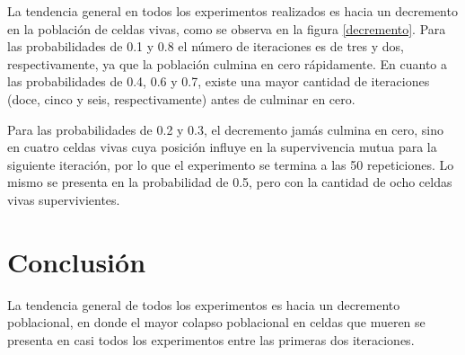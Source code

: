 \documentclass{article}
\begin{document}
La tendencia general en todos los experimentos realizados es hacia un decremento en la población de celdas vivas, como se observa en la figura \ref{decremento}. Para las probabilidades de 0.1 y 0.8 el número de iteraciones es de tres y dos, respectivamente, ya  que la población culmina en cero rápidamente. En cuanto a las probabilidades de 0.4, 0.6 y 0.7, existe una mayor cantidad de iteraciones (doce, cinco y seis, respectivamente) antes de culminar en cero. 

Para las probabilidades de 0.2 y 0.3, el decremento jamás culmina en cero, sino en cuatro celdas vivas cuya posición influye en la supervivencia mutua para la siguiente iteración, por lo que el experimento se termina a las 50 repeticiones. Lo mismo se presenta en la probabilidad de 0.5, pero con la cantidad de ocho celdas vivas supervivientes.

\section{Conclusión}
La tendencia general de todos los experimentos es hacia un decremento poblacional, en donde el mayor colapso poblacional en celdas que mueren se presenta en casi todos los experimentos entre las primeras dos iteraciones.



\end{document}
